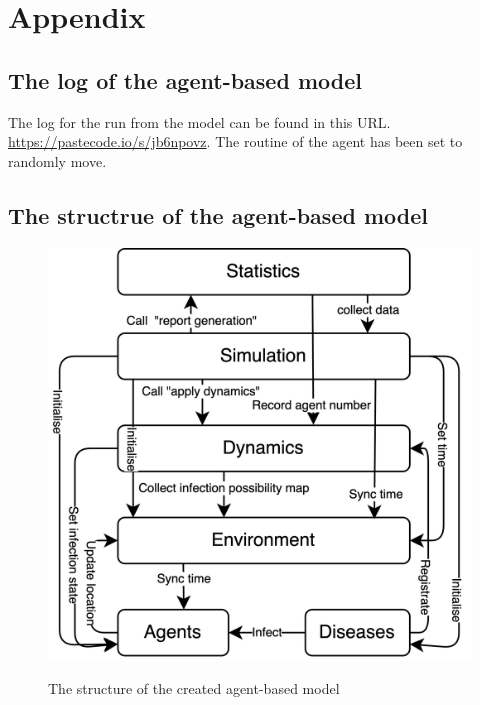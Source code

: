 \documentclass[12pt]{article}
\begin{document}
\newpage

\section{Appendix}
\begin{appendices}
    \subsection{The log of the agent-based model}
    The log for the run from the model can be found in this URL. \url{https://pastecode.io/s/jb6npovz}. The routine of the agent has been set to randomly move.

    \newpage

    \subsection{The structrue of the agent-based model}
    \begin{figure}[ht]
		\centering
		\includegraphics[width=0.6\linewidth]{./assets/model-structure.png}
        \label{fig:model-structure}
		\caption{\scriptsize \sffamily The structure of the created agent-based model} 
	\end{figure}

    \newpage


\end{appendices}
\end{document}
